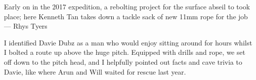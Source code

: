 \begin{marginfigure}
\centering
{}
\caption{Early on in the 2017 expedition, a rebolting project for the surface abseil to \protect{} took place; here Kenneth Tan takes down a tackle sack of new 11mm rope for the job --- Rhys Tyers}
\label{kenneth abseil}
\end{marginfigure}


I identified Davie Dubz as a man who would enjoy sitting around for hours whilst I bolted a route up above the huge pitch. Equipped with drills and rope, we set off down to the pitch head, and I helpfully pointed out facts and cave trivia to Davie, like where Arun and Will waited for rescue last year.

